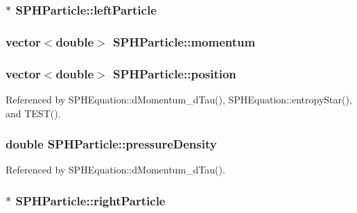 \subsubsection[{left\+Particle}]{$\ast$ S\+P\+H\+Particle\+::left\+Particle}\label{classSPHParticle_a90fd1fe036c3819fb2afdd5f92fbf940}
\hypertarget{classSPHParticle_acddbec39e298ca949be6d3ab524e4be0}{}
\subsubsection[{momentum}]{\setlength{\rightskip}{0pt plus 5cm}vector$<$double$>$ S\+P\+H\+Particle\+::momentum}\label{classSPHParticle_acddbec39e298ca949be6d3ab524e4be0}
\hypertarget{classSPHParticle_ac78fc2da202ad42875390dc4ad389d69}{}
\subsubsection[{position}]{\setlength{\rightskip}{0pt plus 5cm}vector$<$double$>$ S\+P\+H\+Particle\+::position}\label{classSPHParticle_ac78fc2da202ad42875390dc4ad389d69}


Referenced by S\+P\+H\+Equation\+::d\+Momentum\+\_\+d\+Tau(), S\+P\+H\+Equation\+::entropy\+Star(), and T\+E\+S\+T().

\hypertarget{classSPHParticle_ac2ba30a4355e6ae7a4e4c4649f46f63a}{}
\subsubsection[{pressure\+Density}]{\setlength{\rightskip}{0pt plus 5cm}double S\+P\+H\+Particle\+::pressure\+Density}\label{classSPHParticle_ac2ba30a4355e6ae7a4e4c4649f46f63a}


Referenced by S\+P\+H\+Equation\+::d\+Momentum\+\_\+d\+Tau().

\hypertarget{classSPHParticle_ac3d8cdba87d075fd8f90d98cef028491}{}
\subsubsection[{right\+Particle}]{$\ast$ S\+P\+H\+Particle\+::right\+Particle}\label{classSPHParticle_ac3d8cdba87d075fd8f90d98cef028491}
\hypertarget{classSPHParticle_af7b1215febe23bc856039ff338594e9f}{}
